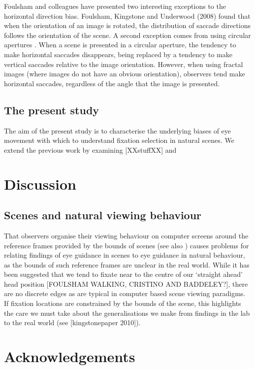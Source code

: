\documentclass[a4paper, twocolumn, oneside, 10pt]{article}
\begin{document}
Foulsham and colleagues have presented two interesting exceptions to the horizontal direction bias. Foulsham, Kingstone and Underwood (2008) found that when the orientation of an image is rotated, the distribution of saccade directions follows the orientation of the scene. A second exception comes from using circular apertures \citep{Foulsham-kingstone2010}. When a scene is presented in a circular aperture, the tendency to make horizontal saccades disappears, being replaced by a tendency to make vertical saccades relative to the image orientation. However, when using fractal images (where images do not have an obvious orientation), observers tend make horizontal saccades, regardless of the angle that the image is presented.

\subsection{The present study}
The aim of the present study is to characterise the underlying biases of eye movement with which to understand fixation selection in natural scenes. We extend the previous work by examining [XXstuffXX] and 






\section{Discussion}


\subsection{Scenes and natural viewing behaviour}
That observers organise their viewing behaviour on computer screens around the reference frames provided by the bounds of scenes (see also \cite{Stainer:2013ce}) causes problems for relating findings of eye guidance in scenes to eye guidance in natural behaviour, as the bounds of such reference frames are unclear in the real world. While it has been suggested that we tend to fixate near to the centre of our `straight ahead' head position [FOULSHAM WALKING, CRISTINO AND BADDELEY?], there are no discrete edges as are typical in computer based scene viewing paradigms. If fixation locations are constrained by the bounds of the scene, this highlights the care we must take about the generalisations we make from findings in the lab to the real world (see [kingstonepaper 2010]). 


\section*{Acknowledgements}


\appendix



\small

\end{document}
